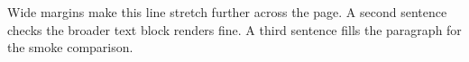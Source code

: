 \documentclass{article}
\begin{document}
Wide margins make this line stretch further across the page.
A second sentence checks the broader text block renders fine.
A third sentence fills the paragraph for the smoke comparison.
\end{document}
